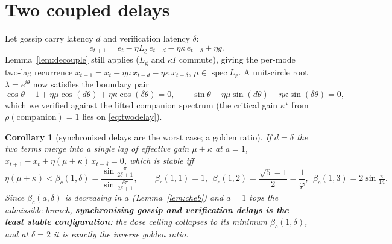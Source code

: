 \documentclass[11pt]{article}
\newtheorem{corollary}{Corollary}
\theoremstyle{definition}
\newcommand{\Lg}{L_{\mathrm g}}
\newcommand{\spec}{\operatorname{spec}}
\begin{document}
\section{Two coupled delays}
Let gossip carry latency $d$ and verification latency $\delta$:
\[
  e_{t+1}=e_t-\eta\Lg\,e_{t-d}-\eta\kappa\,e_{t-\delta}+\eta g .
\]
Lemma~\ref{lem:decouple} still applies ($\Lg$ and $\kappa I$ commute), giving the per-mode
two-lag recurrence $x_{t+1}=x_t-\eta\mu\,x_{t-d}-\eta\kappa\,x_{t-\delta}$, $\mu\in\spec\Lg$. A
unit-circle root $\lambda=e^{i\theta}$ now satisfies the boundary pair
\begin{equation}\label{eq:twodelay}
  \cos\theta-1+\eta\mu\cos(d\theta)+\eta\kappa\cos(\delta\theta)=0,\qquad
  \sin\theta-\eta\mu\sin(d\theta)-\eta\kappa\sin(\delta\theta)=0,
\end{equation}
which we verified against the lifted companion spectrum (the critical gain $\kappa^\star$ from
$\rho(\text{companion})=1$ lies on \eqref{eq:twodelay}).

\begin{corollary}[synchronised delays are the worst case; a golden ratio]\label{cor:equal}
If $d=\delta$ the two terms merge into a single lag of effective gain $\mu+\kappa$ at $a=1$,
$x_{t+1}-x_t+\eta(\mu+\kappa)\,x_{t-\delta}=0$, which is stable iff
\[
  \eta(\mu+\kappa)<\beta_c(1,\delta)=\frac{\sin\frac{\pi}{2\delta+1}}{\sin\frac{\delta\pi}{2\delta+1}},
  \qquad
  \beta_c(1,1)=1,\ \ \beta_c(1,2)=\frac{\sqrt5-1}{2}=\frac1\varphi,\ \ \beta_c(1,3)=2\sin\tfrac{\pi}{14}.
\]
Since $\beta_c(a,\delta)$ is decreasing in $a$ (Lemma~\ref{lem:cheb}) and $a=1$ tops the admissible
branch, \textbf{synchronising gossip and verification delays is the least stable configuration}:
the dose ceiling collapses to its minimum $\beta_c(1,\delta)$, and at $\delta=2$ it is exactly the
inverse golden ratio.
\end{corollary}
\end{document}

